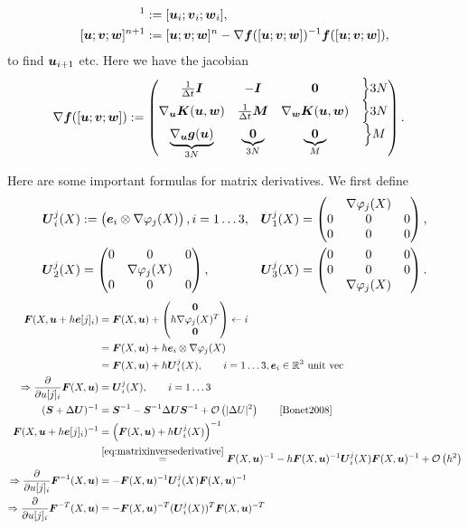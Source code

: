 \begin{align}
	[\vu; \vv; \vw]^1 &:= [\vu_i; \vv_i; \vw_i],\\
	[\vu; \vv; \vw]^{n+1} &:= [\vu; \vv; \vw]^{n} - \nabla \vf([\vu; \vv; \vw])^{-1}\vf([\vu; \vv; \vw]), 
\end{align}
to find $\boldsymbol{u}_{i+1}$ etc.
Here we have the jacobian
\begin{align}
	 \nabla \boldsymbol{f}([\boldsymbol{u}; \boldsymbol{v}; \boldsymbol{w}]) &:= \left(\begin{matrix}\frac{1}{\Delta t} \boldsymbol{I} & -\boldsymbol{I} & \boldsymbol{0} & \Bigl\rbrace3N\\
	 									\nabla_{\boldsymbol{u}}\boldsymbol{K}(\boldsymbol{u},\boldsymbol{w}) & \frac{1}{\Delta t}\boldsymbol{M} & \nabla_{\boldsymbol{w}}\boldsymbol{K}(\boldsymbol{u},\boldsymbol{w}) & \Bigl\rbrace3N\\
	 									\underbrace{\nabla_{\boldsymbol{u}}\boldsymbol{g}(\boldsymbol{u})}_{3N} & \underbrace{\boldsymbol{0}}_{3N} & \underbrace{\boldsymbol{0}}_{M} & \Bigl\rbrace M\end{matrix}\right).
\end{align}

Here are some important formulas for matrix derivatives. We first define
\begin{align}
    \boldsymbol{U}^j_i(X) & := \left(\begin{matrix}\boldsymbol{e}_i\otimes\nabla\varphi_{j}(X)\end{matrix}\right), i=1\ldots3, &
	\boldsymbol{U}^j_1(X) &= \left(\begin{matrix}
            ~   & \nabla\varphi_{j}(X)  & ~ \\
            0   & 0                 & 0 \\
            0   & 0                 & 0
          \end{matrix}\right),\\
  \boldsymbol{U}^j_2(X) &= \left(\begin{matrix}
            0   & 0                 & 0 \\
            ~   & \nabla\varphi_{j}(X)  & ~ \\            
            0   & 0                 & 0
          \end{matrix}\right),& 
  \boldsymbol{U}^j_3(X) & = \left(\begin{matrix}
            0   & 0                 & 0 \\
            0   & 0                 & 0 \\
            ~   & \nabla\varphi_{j}(X)  & ~            
          \end{matrix}\right).
\end{align}
\begin{align}
	\vF(X,\vu + h\ve[j]_i) &= \vF(X,\vu) + \m{\vnull \\ h\dpj^T\\ \vnull}\leftarrow i\nonumber\\
	&= \vF(X,\vu) + h\ve_i\otimes\dpj\\
	&= \vF(X,\vu) + h\vU^j_i(X),\qquad i=1\ldots3,\ve_i\in\R^3 \text{ unit vec}\nonumber\\
	\Rightarrow \d{}{u[j]_i}\vF(X,\vu) &= \vU^j_i(X),\qquad i=1\ldots3\nonumber\\
	(\vS+\Delta\vU)^{-1} &= \vS^{-1} - \vS^{-1}\Delta\vU\vS^{-1} + \O{|\Delta U|^2}\qquad\cite[p.57]{Bonet2008}\label{eq:matrixinversederivative}\\
	\vF(X,\vu + h\ve[j]_i)^{-1} &= \left(\vF(X,\vu) + h\vU^j_i(X)\right)^{-1}\nonumber\\
		&\re{eq:matrixinversederivative}\vF(X,\vu)^{-1} - h\vF(X,\vu)^{-1}\vU^j_i(X)\vF(X,\vu)^{-1} + \O{h^2}\nonumber\\
	\Rightarrow\d{}{u[j]_i}\vF^{-1}(X,\vu) &= -\vF(X,\vu)^{-1}\vU^j_i(X)\vF(X,\vu)^{-1}\nonumber\\
	\Rightarrow\d{}{u[j]_i}\vF^{-T}(X,\vu) &= -\vF(X,\vu)^{-T}(\vU^j_i(X))^{T}\vF(X,\vu)^{-T}\nonumber
\end{align}

